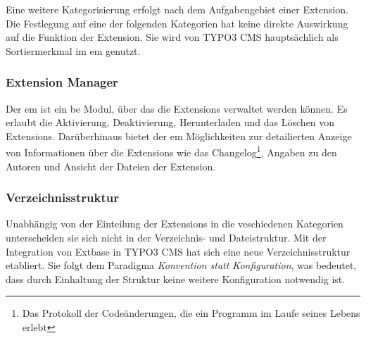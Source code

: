 Eine weitere Kategorisierung erfolgt nach dem Aufgabengebiet einer Extension. Die Festlegung auf eine der folgenden Kategorien hat keine direkte Auswirkung auf die Funktion der Extension. Sie wird von TYPO3 CMS hauptsächlich als Sortiermerkmal im \gls{em} genutzt.

\subsubsection{Extension Manager}
Der \gls{em} ist ein \gls{be} Modul, über das die Extensions verwaltet werden können. Es erlaubt die Aktivierung, Deaktivierung, Herunterladen und das Löschen von Extensions. Darüberhinaus bietet der \gls{em} Möglichkeiten zur detailierten Anzeige von Informationen über die Extensions wie das Changelog\footnote{Das Protokoll der Codeänderungen, die ein Programm im Laufe seines Lebens erlebt}, Angaben zu den Autoren und Ansicht der Dateien der Extension.

\subsubsection{Verzeichnisstruktur}
Unabhängig von der Einteilung der Extensions in die veschiedenen Kategorien unterscheiden sie sich nicht in der Verzeichnis- und Dateistruktur. Mit der Integration von Extbase in TYPO3 CMS hat sich eine neue Verzeichnisstruktur etabliert. Sie folgt dem Paradigma \textit{Konvention statt Konfiguration}, was bedeutet, dass durch Einhaltung der Struktur keine weitere Konfiguration notwendig ist.

